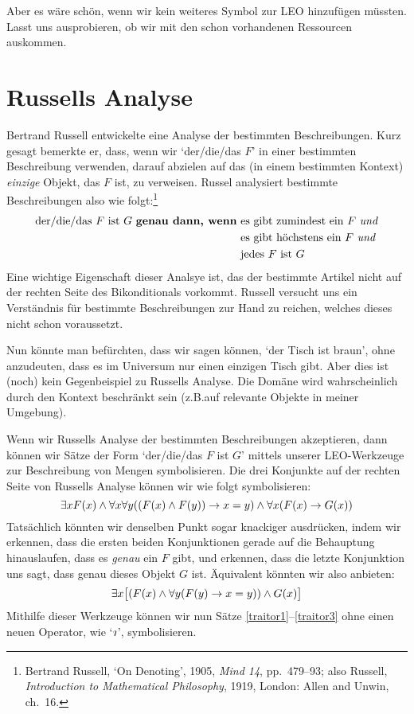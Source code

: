 Aber es wäre schön, wenn wir kein weiteres Symbol zur LEO hinzufügen müssten. Lasst uns ausprobieren, ob wir mit den schon vorhandenen Ressourcen auskommen.

\section{Russells Analyse}
Bertrand Russell entwickelte eine Analyse der bestimmten Beschreibungen. Kurz gesagt bemerkte er, dass, wenn wir `der/die/das $F$' in einer bestimmten Beschreibung verwenden, darauf abzielen auf das (in einem bestimmten Kontext) \emph{einzige} Objekt, das $F$ ist, zu verweisen. Russel analysiert bestimmte Beschreibungen also wie folgt:\footnote{Bertrand Russell, `On Denoting', 1905, \emph{Mind 14}, pp.\ 479--93; also Russell, \emph{Introduction to Mathematical Philosophy}, 1919, London: Allen and Unwin, ch.\ 16.}
	\begin{align*}
		\text{der/die/das $F$ ist $G$ \textbf{genau dann, wenn} }&\text{es gibt zumindest ein $F$ \emph{und}}\\
	&\text{es gibt höchstens ein $F$ \emph{und}}\\	
	&\text{jedes $F$ ist $G$}
\end{align*}
Eine wichtige Eigenschaft dieser Analsye ist, das der bestimmte Artikel nicht auf der rechten Seite des Bikonditionals vorkommt. Russell versucht uns ein Verständnis für bestimmte Beschreibungen zur Hand zu reichen, welches dieses nicht schon voraussetzt. 

Nun könnte man befürchten, dass wir sagen können, `der Tisch ist braun', ohne anzudeuten, dass es im Universum nur einen einzigen Tisch gibt. Aber dies ist (noch) kein Gegenbeispiel zu Russells Analyse. Die Domäne wird wahrscheinlich durch den Kontext beschränkt sein (z.B.\@ auf relevante Objekte in meiner Umgebung).

Wenn wir Russells Analyse der bestimmten Beschreibungen akzeptieren, dann können wir Sätze der Form `der/die/das $F$ ist $G$' mittels unserer LEO-Werkzeuge zur Beschreibung von Mengen symbolisieren. Die drei Konjunkte auf der rechten Seite von Russells Analyse können wir wie folgt symbolisieren:
	$$\exists x \mathord{F}(x) \wedge \forall x \forall y ((\mathord{F}(x) \wedge \mathord{F}(y)) \rightarrow x = y) \wedge \forall x (\mathord{F}(x) \rightarrow \mathord{G}(x))$$
Tatsächlich könnten wir denselben Punkt sogar knackiger ausdrücken, indem wir erkennen, dass die ersten beiden Konjunktionen gerade auf die Behauptung hinauslaufen, dass es \emph{genau} ein $F$ gibt, und erkennen, dass die letzte Konjunktion uns sagt, dass genau dieses Objekt $G$ ist. Äquivalent könnten wir also anbieten:
	$$\exists x \bigl[(\mathord{F}(x) \wedge \forall y (\mathord{F}(y) \rightarrow x = y)) \wedge \mathord{G}(x)\bigr]$$
Mithilfe dieser Werkzeuge können wir nun Sätze \ref{traitor1}--\ref{traitor3} ohne einen neuen Operator, wie `$\maththe$', symbolisieren. 

